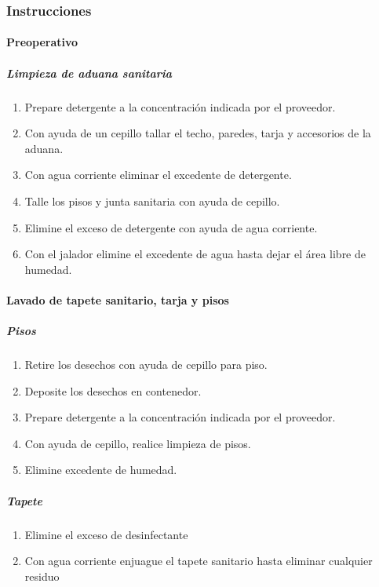 \subsubsection{Instrucciones}

\paragraph{Preoperativo}

\subparagraph{Limpieza de aduana sanitaria}

\begin{enumerate}
	\item Prepare detergente a la concentración indicada por el proveedor.
	\item Con ayuda de un cepillo tallar el techo, paredes, tarja y accesorios de la aduana.
	\item Con agua corriente eliminar el excedente de detergente.
	\item Talle los pisos y junta sanitaria con ayuda de cepillo.
	\item Elimine el exceso de detergente con ayuda de agua corriente.
	\item Con el jalador elimine el excedente de agua hasta dejar el área libre de humedad.
\end{enumerate}

\paragraph{Lavado de tapete sanitario, tarja y pisos}

\subparagraph{Pisos}

\begin{enumerate}
	\item Retire los desechos con ayuda de cepillo para piso.
	\item Deposite los desechos en contenedor.
	\item Prepare detergente a la concentración indicada por el proveedor.
	\item Con ayuda de cepillo, realice limpieza de pisos.
	\item Elimine excedente de humedad.
\end{enumerate}

\subparagraph{Tapete}

\begin{enumerate}
	\item Elimine el exceso de desinfectante
	\item Con agua corriente enjuague el tapete sanitario hasta eliminar cualquier residuo
\end{enumerate}

